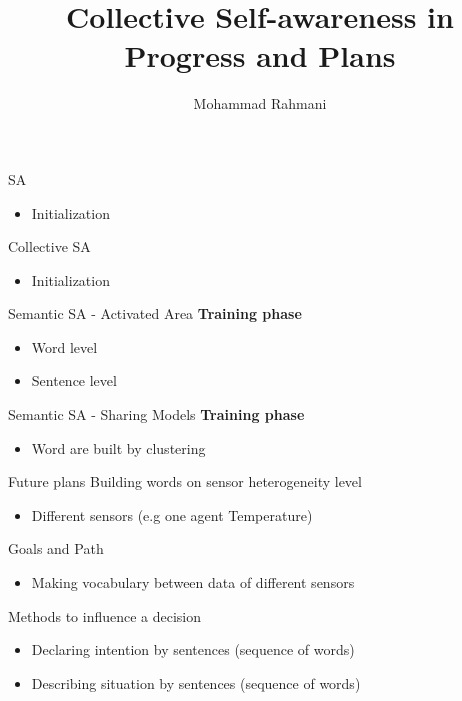 \documentclass[unknownkeysallowed]{beamer}
\title{Collective Self-awareness in Progress and Plans}
\author{Mohammad Rahmani}
\institute{DECIDE Doctoral School}
\begin{document}
	\begin{frame}
		\maketitle
	\end{frame}
	
	\begin{frame}{SA}
		\begin{itemize}
			\item Initialization
		\end{itemize}
	\end{frame}

	\begin{frame}{Collective SA}
		\begin{itemize}
			\item Initialization
		\end{itemize}
	\end{frame}

	\begin{frame}{Semantic SA - Activated Area}
		\textbf{Training phase}
		\begin{itemize}
			\item Word level
			\item Sentence level
		\end{itemize}
	\end{frame}

	\begin{frame}{Semantic SA - Sharing Models}
		\textbf{Training phase}
		\begin{itemize}
			\item Word are built by clustering 
		\end{itemize}
	\end{frame}

	\begin{frame}{Future plans}
		Building words on sensor heterogeneity level
		\begin{itemize}
			\item Different sensors (e.g one agent Temperature)
		\end{itemize}
		Goals and Path
		\begin{itemize}
			\item Making vocabulary between data of different sensors
		\end{itemize}
	\end{frame}

	\begin{frame}{Methods to influence a decision}
		\begin{itemize}
			\item Declaring intention by sentences (sequence of words)
			\item Describing situation by sentences (sequence of words)
		\end{itemize}
	\end{frame}
\end{document}
